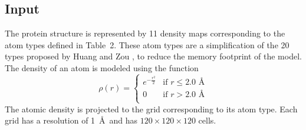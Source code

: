 \documentclass{bioinfo}
\begin{document}
\subsection{Input}
The protein structure is represented by 11 density maps corresponding
to the atom types defined in Table~2\vphantom{\ref{Tbl:atomTypes}}. These atom
types are a simplification of the 20 types proposed by Huang and
Zou \citep{huang2006iterative, huang2008iterative}, to reduce the
memory footprint of the model.
The density of an atom is modeled using the function
\begin{equation}
\label{eq:rho}
\rho(r) =  \begin{cases}
               e^{-\frac{r^2}{2}}&\text{if } r\leq 2.0\text{ \AA} \\
               0                 &\text{if } r>2.0\text{ \AA} \\
            \end{cases}
\end{equation}
The atomic density is projected to the grid corresponding to its atom
type. Each grid has a resolution of 1~\AA\ and has $120\times
120\times 120$ cells.
\end{document}

